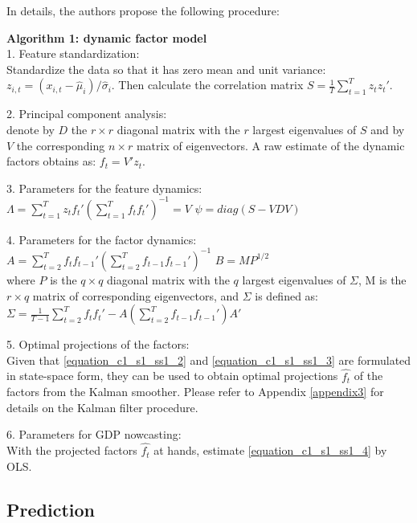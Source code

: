 In details, the authors propose the following procedure:

\textbf{Algorithm 1: dynamic factor model} \vspace{3mm} \\
1. Feature standardization: \\
Standardize the data so that it has zero mean and unit variance: $z_{i,t} = (x_{i,t} - \hat{\mu}_i) / \hat{\sigma}_i$. Then calculate the correlation matrix $S = \frac{1}{T} \sum_{t=1}^{T} z_t z_t'$. \\

\newpage

2. Principal component analysis:\\
denote by $D$ the $r \times r$ diagonal matrix with the $r$ largest eigenvalues of $S$ and by $V$ the corresponding $n \times r$ matrix of eigenvectors. A raw estimate of the dynamic factors obtains as: $f_t = V' z_t$.

3. Parameters for the feature dynamics: \\
$\Lambda = \sum_{t=1}^{T} z_t f_t' \left( \sum_{t=1}^{T} f_t f_t' \right)^{-1} = V$ \hspace{2cm}
$\psi = diag(S - VDV)$

4. Parameters for the factor dynamics: \\
$A = \sum_{t=2}^{T} f_t f_{t-1}' \left( \sum_{t=2}^{T} f_{t-1} f_{t-1}' \right)^{-1}$ \hspace{2cm}
$B = M P^{1/2}$ \\
where $P$ is the $q \times q$ diagonal matrix with the $q$ largest eigenvalues of $\Sigma$, M is the $r \times q$ matrix of corresponding eigenvectors, and $\Sigma$ is defined as: \\
$\Sigma = \frac{1}{T-1} \sum_{t=2}^{T} f_t f_t' - A \left( \sum_{t=2}^{T} f_{t-1} f_{t-1}' \right) A'$

5. Optimal projections of the factors: \\
Given that \ref{equation_c1_s1_ss1_2} and \ref{equation_c1_s1_ss1_3} are formulated in state-space form, they can be used to obtain optimal projections $\hat{f_t}$ of the factors from the Kalman smoother. Please refer to Appendix \ref{appendix3} for details on the Kalman filter procedure.

6. Parameters for GDP nowcasting: \\
With the projected factors $\hat{f_t}$ at hands, estimate \ref{equation_c1_s1_ss1_4} by OLS.


\subsection{Prediction}
\label{chapter3_section1_subsection3}

